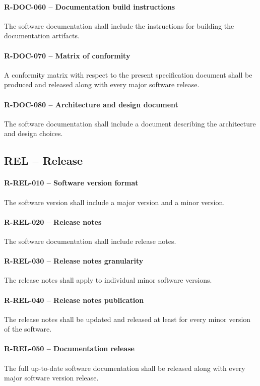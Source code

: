 \paragraph{R-DOC-060 -- Documentation build instructions}
The software documentation shall include the instructions for building
the documentation artifacts.

\paragraph{R-DOC-070 -- Matrix of conformity}
A conformity matrix with respect to the present specification document shall
be produced and released along with every major software release.

\paragraph{R-DOC-080 -- Architecture and design document}
The software documentation shall include a document describing the architecture
and design choices.

\subsection{REL -- Release}
\paragraph{R-REL-010 -- Software version format}
The software version shall include a major version and a minor version.

\paragraph{R-REL-020 -- Release notes}
The software documentation shall include release notes.

\paragraph{R-REL-030 -- Release notes granularity}
The release notes shall apply to individual minor software versions.

\paragraph{R-REL-040 -- Release notes publication}
The release notes shall be updated and released at least for every minor
version of the software.

\paragraph{R-REL-050 -- Documentation release}
The full up-to-date software documentation shall be released along with
every major software version release.

